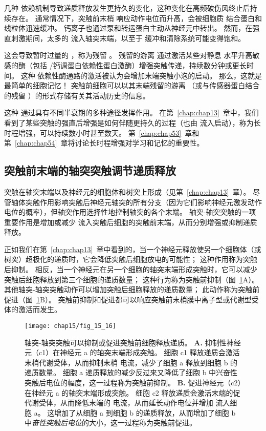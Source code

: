 几种  依赖机制导致递质释放发生更持久的变化，这种变化在高频破伤风终止后持续存在。
通常情况下，突触前末梢  响应动作电位而升高，会被细胞质  结合蛋白和线粒体迅速缓冲。
钙离子也通过泵和转运蛋白主动从神经元中转出。
然而，在强直刺激期间，太多的  流入轴突末端，以至于  缓冲和清除系统可能变得饱和。


这会导致暂时过量的 ，称为残留 。
残留的游离  通过激活某些对静息  水平升高敏感的酶（包括 /钙调蛋白依赖性蛋白激酶）增强突触传递，持续数分钟或更长时间。
这种  依赖性酶通路的激活被认为会增加末端突触小泡的启动。
那么，这就是最简单的细胞记忆！
突触前细胞可以以其末端残留的游离 （或与传感器蛋白结合的残留 ）的形式存储有关其活动历史的信息。


这种  通过具有不同半衰期的多种途径发挥作用。 
在第~\ref{chap:chap13}~章中，我们看到了某些突触的强直后增强是如何伴随更持久的过程（也由  流入启动），称为长时程增强，可以持续数小时甚至数天。
第~\ref{chap:chap53}~章和第~\ref{chap:chap54}~章将讨论长时程增强对学习和记忆的重要性。



\subsection{突触前末端的轴突突触调节递质释放}

突触在轴突末端以及神经元的细胞体和树突上形成（见第~\ref{chap:chap13}~章）。
尽管轴体突触作用影响突触后神经元轴突的所有分支（因为它们影响神经元激发动作电位的概率），但轴突作用选择性地控制轴突的各个末端。
轴突-轴突突触的一项重要作用是增加或减少  流入突触后细胞的突触前末端，从而分别增强或抑制递质释放。


正如我们在第~\ref{chap:chap13}~章中看到的，当一个神经元释放使另一个细胞体（或树突）超极化的递质时，它会降低突触后细胞放电的可能性；
这种作用称为突触后抑制。
相反，当一个神经元在另一个细胞的轴突末端形成突触时，它可以减少突触后细胞释放到第三个细胞的递质数量；
这种行为称为突触前抑制（图~\ref{fig:15_16}A）。
其他轴突-轴突突触动作可以增加突触后细胞释放的递质数量；
此动作称为突触前促进（图~\ref{fig:15_16}B）。
突触前抑制和促进都可以响应突触前末梢膜中离子型或代谢型受体的激活而发生。


\begin{figure}[htbp]
	\centering
	\texttt{[image: chap15/fig\_15\_16]}
	\caption{轴突-轴突突触可以抑制或促进突触前细胞释放递质。
		\textbf{A.} 抑制性神经元（c1）在神经元 a 的轴突末端形成突触。
		细胞 c1 释放递质会激活末梢代谢受体，从而抑制末梢  电流，减少了细胞 a 释放到细胞 b 的递质数量。
		细胞 a 递质释放的减少反过来又降低了细胞 b 中兴奋性突触后电位的幅度，这一过程称为突触前抑制。
		\textbf{B.} 促进神经元（c2）在神经元 a 的轴突末端形成突触。
		细胞 c2 释放递质会激活末端的促代谢受体，从而降低末端的  电流，从而延长动作电位并增加  流入细胞 a。
		这增加了从细胞 a 到细胞 b 的递质释放，从而增加了细胞 b 中\textit{奋性突触后电位}的大小，这一过程称为突触前促进。}
	\label{fig:15_16}
\end{figure}



